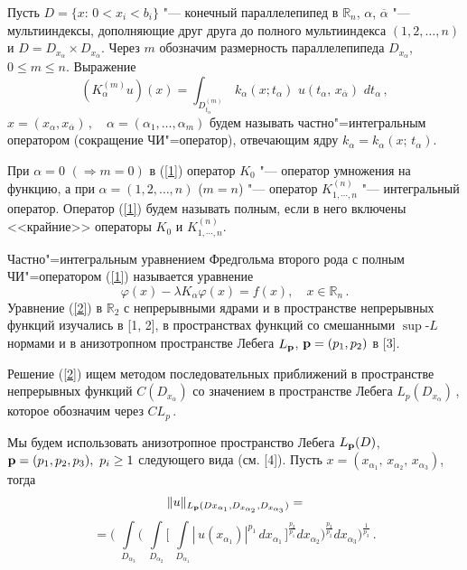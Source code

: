 
\vzmscaption

Пусть $D=\{x:\,0<x_i<b_i\}$ "--- конечный параллелепипед в $\mathbb{R}_n$, $\alpha$, ${\overline\alpha}$ "--- мультииндексы, дополняющие друг друга до полного мультииндекса $(1,2,\ldots,n)$ и $D=D_{x_\alpha}\times D_{x_{\overline\alpha}}$. Через $m$ обозначим размерность
параллелепипеда $D_{x_\alpha}$, $0\leq m\leq n$. Выражение
\begin{equation}\label{1}
(K^{(m)}_{\alpha} u)(x)=\int_{D^{(m)}_{t_\alpha}} \,k_{\alpha}(x;t_\alpha) \,\,u(t_\alpha,
\,x_{\overline{\alpha}})\,\,dt_\alpha\,,
\end{equation}
$
x=(x_\alpha,x_{\overline\alpha})\,,\quad
\alpha=(\alpha_1,\ldots,\alpha_m)$
будем называть частно"=интегральным оператором (сокращение ЧИ"=оператор), отвечающим ядру $k_{\alpha}=k_{\alpha}(x;\, t_\alpha)$.

При $\alpha=0$ $(\Rightarrow m=0)$ в (\ref{1}) оператор $K_0$ "--- оператор умножения на функцию, а при $\alpha=(1,2,\ldots,n)$ ($m=n$) "--- оператор $K_{1,\cdots,n}^{(n)}$ "--- интегральный оператор.
Оператор (\ref{1}) будем называть полным, если в него включены <<крайние>> операторы $K_0$ и $K_{1,\cdots,n}^{(n)}$.

Частно"=интегральным уравнением Фредгольма второго рода с полным ЧИ"=оператором (\ref{1}) называется уравнение
 \begin{equation}\label{2}
\varphi(x)-\lambda K_{\alpha}\varphi(x)=f(x), \quad x\in\mathbb{R}_n\,.
\end{equation}
Уравнение (\ref{2}) в $\mathbb{R}_2$ с непрерывными ядрами и в пространстве непрерывных функций  изучались в [1, 2], в пространствах функций со смешанными $\sup$-$L$ нормами и в анизотропном пространстве Лебега $L_{\bf p}$, ${\bf p}=(p_1,p_2)$ в [3].

Решение (\ref{2}) ищем методом последовательных приближений в пространстве непрерывных функций  $C(D_{x_{\overline\alpha}})$ со значением в пространстве Лебега
$ L_p(D_{x_{\alpha}})$\,, которое обозначим через $CL_p$\,.

Мы будем использовать анизотропное пространство Лебега $L_{\bf p}(D)$, ${\bf p}=(p_1,p_2,p_3),~p_i\geq 1$ следующего вида (см. [4]). Пусть $x=(x_{\alpha_1},\,x_{\alpha_2},\,x_{\alpha_3})$, тогда
$$
\|u\|_{L_{\bf p}(D{x_{\alpha_1},D_{x_{\alpha_2}},
D_{x_{\alpha_3}})}}=
$$
$$
=\Biggl(\,\, \int\limits_{D_{\alpha_3}} \Biggl(\,\, \int\limits_{D_{\alpha_2}}\biggl[\,\,
\int\limits_{D_{\alpha_1}} |\,u(x_{\alpha_1})|^{p_1} \,dx_{\alpha_1} \,\biggr]^\frac{p_2}{p_1} dx_{\alpha_2}\Biggr)^{\frac{p_3}{p_{2}}} dx_{\alpha_3}\Biggr)^{\frac{1}{p_3}} \,.
$$

